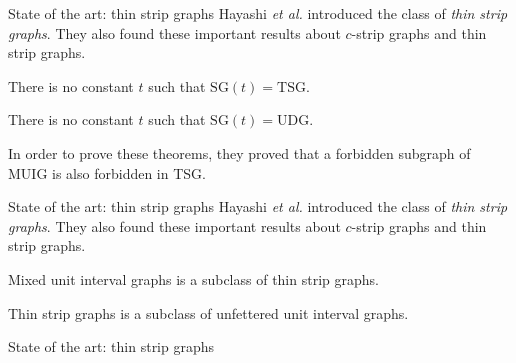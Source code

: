 \begin{frame}{State of the art: thin strip graphs}
  Hayashi \textit{et al.} introduced the class of \textit{thin strip graphs}. They also found these important results about $c$-strip graphs and thin strip graphs.
  \vfill
  \begin{theorem}
    There is no constant $t$ such that $\text{SG}(t) = \text{TSG}$.
  \end{theorem}
  \begin{theorem}
    There is no constant $t$ such that $\text{SG}(t) = \text{UDG}$.
  \end{theorem}
  \pause
  In order to prove these theorems, they proved that a forbidden subgraph of MUIG is also forbidden in TSG.
\end{frame}

\begin{frame}{State of the art: thin strip graphs}
  Hayashi \textit{et al.} introduced the class of \textit{thin strip graphs}. They also found these important results about $c$-strip graphs and thin strip graphs.
  \vfill
  \begin{theorem}
    Mixed unit interval graphs is a subclass of thin strip graphs.
  \end{theorem}
  \begin{theorem}
    Thin strip graphs is a subclass of unfettered unit interval graphs.
  \end{theorem}
\end{frame}

\begin{frame}{State of the art: thin strip graphs}
  \begin{figure}
  \begin{center}
  \end{center}
  \label{fig:hierarchyTSG}
  \end{figure}
\end{frame}

